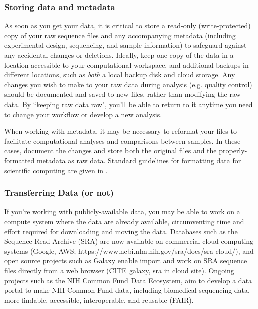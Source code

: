 \documentclass[10pt,letterpaper]{article}
\begin{document}
% 


\subsubsection*{Storing data and metadata} %

As soon as you get your data, it is critical to store a read-only (write-protected) copy of your raw sequence files and any accompanying metadata (including experimental design, sequencing, and sample information) to safeguard against any accidental changes or deletions.
Ideally, keep one copy of the data in a location accessible to your computational workspace, and additional backups in different locations, such as \textit{both} a local backup disk and cloud storage.
Any changes you wish to make to your raw data during analysis (e.g. quality control) should be documented and saved to new files, rather than modifying the raw data. 
By ``keeping raw data raw", you'll be able to return to it anytime you need to change your workflow or develop a new analysis. 

When working with metadata, it may be necessary to reformat your files to facilitate computational analyses and comparisons between samples. In these cases, document the changes and store both the original files and the properly-formatted metadata as raw data. Standard guidelines for formatting data for scientific computing are given in \cite{wilson2017good}.


\subsubsection*{Transferring Data (or not)} 

If you're working with publicly-available data, you may be able to work on a compute system where the data are already available, circumventing time and effort required for downloading and moving the data.
Databases such as the Sequence Read Archive (SRA) are now available on commercial cloud computing systems (Google, AWS; https://www.ncbi.nlm.nih.gov/sra/docs/sra-cloud/), and open source projects such as Galaxy enable import and work on SRA sequence files directly from a web browser (CITE galaxy, sra in cloud site). Ongoing projects such as the NIH Common Fund Data Ecosystem, aim to develop a data portal to make NIH Common Fund data, including biomedical sequencing data, more findable,
accessible, interoperable, and reusable (FAIR). 
\end{document}
